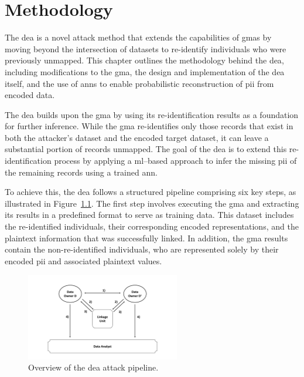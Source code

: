 \chapter{Methodology}  \label{sec:method}

The \ac{dea} is a novel attack method that extends the capabilities of \ac{gma}s by moving beyond the intersection of datasets to re-identify individuals who were previously unmapped.
This chapter outlines the methodology behind the \ac{dea}, including modifications to the \ac{gma}, the design and implementation of the \ac{dea} itself, and the use of \ac{ann}s to enable probabilistic reconstruction of \ac{pii} from encoded data.

The \ac{dea} builds upon the \ac{gma} by using its re-identification results as a foundation for further inference.
While the \ac{gma} re-identifies only those records that exist in both the attacker’s dataset and the encoded target dataset, it can leave a substantial portion of records unmapped.
The goal of the \ac{dea} is to extend this re-identification process by applying a \ac{ml}–based approach to infer the missing \ac{pii} of the remaining records using a trained \ac{ann}.

To achieve this, the \ac{dea} follows a structured pipeline comprising six key steps, as illustrated in Figure~\ref{fig:deaoverview}.
The first step involves executing the \ac{gma} and extracting its results in a predefined format to serve as training data.
This dataset includes the re-identified individuals, their corresponding encoded representations, and the plaintext information that was successfully linked.
In addition, the \ac{gma} results contain the non-re-identified individuals, who are represented solely by their encoded \ac{pii} and associated plaintext values.

\begin{figure}[H]
    \centering
    \includegraphics[width=0.6\textwidth, page=15]{img/visualization.pdf}
    \caption{Overview of the \ac{dea} attack pipeline.}
    \label{fig:deaoverview}
\end{figure}

